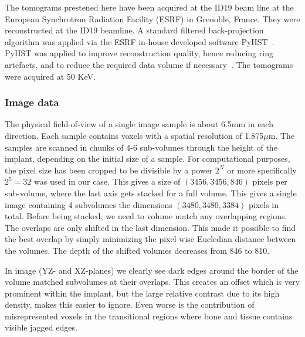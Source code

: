 The tomograms prestened here have been acquired at the ID19 beam line at the European Synchrotron
Radiation Facility (ESRF) in Grenoble, France. They were reconstructed\citep{sporring} at the ID19
beamline. A standard filtered back-projection algorithm was applied via the ESRF in-house developed
software PyHST~\citep{NELDAM2015682}\citep{pyhst}. PyHST was applied to improve reconstruction
quality, hence reducing ring artefacts, and to reduce the required data volume if
necessary~\cite{MIRONE201441}. The tomograms were acquired at 50 KeV.

\subsubsection{Image data}

The physical field-of-view of a single image sample is about 6.5mm in each direction. Each sample
contains voxels with a spatial resolution of 1.875$\mu$m. The samples are scanned in chunks of 4-6
sub-volumes through the height of the implant, depending on the initial size of a sample.  For
computational purposes, the pixel size has been cropped to be divisible by a power $2^N$ or more
specifically $2^5=32$ was used in our case. This gives a size of $(3456,3456,846)$ pixels per
sub-volume, where the last axis gets stacked for a full volume. This gives a single image containing
4 subvolumes the dimensions $(3480,3480,3384)$ pixels in total. Before being stacked, we need to
volume match any overlapping regions. The overlaps are only shifted in the last dimension.  This
made it possible to find the best overlap by simply minimizing the pixel-wise Eucledian distance
between the volumes. The depth of the shifted volumes decreases from 846 to 810.

In image  (YZ- and XZ-planes) we clearly see dark edges around the border of
the volume matched subvolumes at their overlaps. This creates an offset which is very prominent
within the implant, but the large relative contrast due to its high density, makes this easier to
ignore.  Even worse is the contribution of misrepresented voxels in the transitional regions where
bone and tissue contains visible jagged edges.


